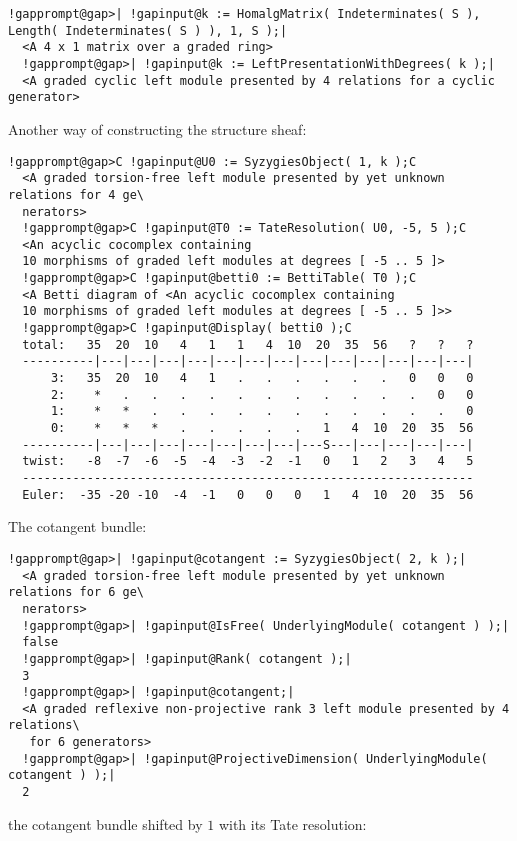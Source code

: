 \documentclass[a4paper,11pt]{report}
\begin{document}
{{{\begin{Verbatim}[commandchars=!@|,fontsize=\small,frame=single,label=Example]
  !gapprompt@gap>| !gapinput@k := HomalgMatrix( Indeterminates( S ), Length( Indeterminates( S ) ), 1, S );|
  <A 4 x 1 matrix over a graded ring>
  !gapprompt@gap>| !gapinput@k := LeftPresentationWithDegrees( k );|
  <A graded cyclic left module presented by 4 relations for a cyclic generator>
\end{Verbatim}
 Another way of constructing the structure sheaf: 
\begin{Verbatim}[commandchars=!@C,fontsize=\small,frame=single,label=Example]
  !gapprompt@gap>C !gapinput@U0 := SyzygiesObject( 1, k );C
  <A graded torsion-free left module presented by yet unknown relations for 4 ge\
  nerators>
  !gapprompt@gap>C !gapinput@T0 := TateResolution( U0, -5, 5 );C
  <An acyclic cocomplex containing
  10 morphisms of graded left modules at degrees [ -5 .. 5 ]>
  !gapprompt@gap>C !gapinput@betti0 := BettiTable( T0 );C
  <A Betti diagram of <An acyclic cocomplex containing 
  10 morphisms of graded left modules at degrees [ -5 .. 5 ]>>
  !gapprompt@gap>C !gapinput@Display( betti0 );C
  total:   35  20  10   4   1   1   4  10  20  35  56   ?   ?   ?
  ----------|---|---|---|---|---|---|---|---|---|---|---|---|---|
      3:   35  20  10   4   1   .   .   .   .   .   .   0   0   0
      2:    *   .   .   .   .   .   .   .   .   .   .   .   0   0
      1:    *   *   .   .   .   .   .   .   .   .   .   .   .   0
      0:    *   *   *   .   .   .   .   .   1   4  10  20  35  56
  ----------|---|---|---|---|---|---|---|---S---|---|---|---|---|
  twist:   -8  -7  -6  -5  -4  -3  -2  -1   0   1   2   3   4   5
  ---------------------------------------------------------------
  Euler:  -35 -20 -10  -4  -1   0   0   0   1   4  10  20  35  56
\end{Verbatim}
 The cotangent bundle: 
\begin{Verbatim}[commandchars=!@|,fontsize=\small,frame=single,label=Example]
  !gapprompt@gap>| !gapinput@cotangent := SyzygiesObject( 2, k );|
  <A graded torsion-free left module presented by yet unknown relations for 6 ge\
  nerators>
  !gapprompt@gap>| !gapinput@IsFree( UnderlyingModule( cotangent ) );|
  false
  !gapprompt@gap>| !gapinput@Rank( cotangent );|
  3
  !gapprompt@gap>| !gapinput@cotangent;|
  <A graded reflexive non-projective rank 3 left module presented by 4 relations\
   for 6 generators>
  !gapprompt@gap>| !gapinput@ProjectiveDimension( UnderlyingModule( cotangent ) );|
  2
\end{Verbatim}
 the cotangent bundle shifted by $1$ with its Tate resolution: 
\begin{Verbatim}[commandchars=!@C,fontsize=\small,frame=single,label=Example]

\end{Verbatim}}}}
\end{document}
